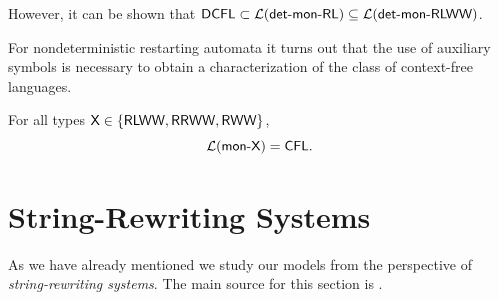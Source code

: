 \noindent However, it can be shown that   $\DCFL \subset \calL{\detmonRL} \subseteq \calL{\detmonRLWW}$.

For nondeterministic restarting automata it turns out that the use of auxiliary symbols is necessary to obtain a characterization of the class of context-free languages.

\index{$\CFL$}
\begin{theorem}
For all types $\mbox{\sf X} \in \{\mbox{\sf RLWW}, \mbox{\sf RRWW}, \mbox{\sf RWW}\}$, $$\calL{\monX} = \CFL.$$
\end{theorem}

\section{String-Rewriting Systems}
\label{section:string-rewriting-systems}

As we have already mentioned we study our models from the perspective of \emph{string-rewriting systems}. The main source for this section is \cite{bookOtto93}.

